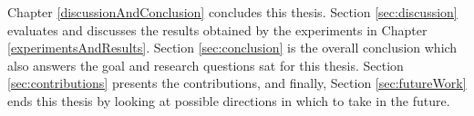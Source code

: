 Chapter \ref{discussionAndConclusion} concludes this thesis. Section \ref{sec:discussion} evaluates and discusses the results obtained by the experiments in Chapter \ref{experimentsAndResults}. Section \ref{sec:conclusion} is the overall conclusion which also answers the goal and research questions sat for this thesis. Section \ref{sec:contributions} presents the contributions, and finally, Section \ref{sec:futureWork} ends this thesis by looking at possible directions in which to take in the future. 

